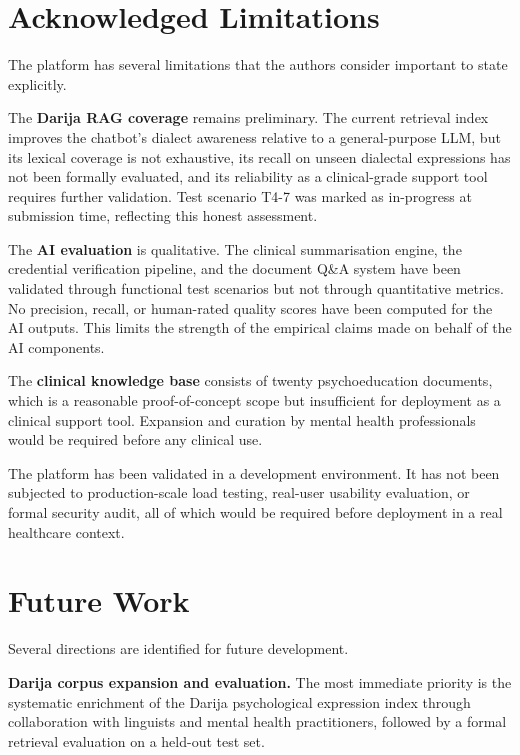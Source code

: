 \documentclass[a4paper,12pt]{report}
\begin{document}
\section*{Acknowledged Limitations}
{}

The platform has several limitations that the authors consider important
to state explicitly.

The \textbf{Darija RAG coverage} remains preliminary. The current retrieval
index improves the chatbot's dialect awareness relative to a general-purpose
LLM, but its lexical coverage is not exhaustive, its recall on unseen
dialectal expressions has not been formally evaluated, and its reliability
as a clinical-grade support tool requires further validation. Test scenario
T4-7 was marked as in-progress at submission time, reflecting this honest
assessment.

The \textbf{AI evaluation} is qualitative. The clinical summarisation engine,
the credential verification pipeline, and the document Q\&A system have been
validated through functional test scenarios but not through quantitative
metrics. No precision, recall, or human-rated quality scores have been
computed for the AI outputs. This limits the strength of the empirical claims
made on behalf of the AI components.

The \textbf{clinical knowledge base} consists of twenty psychoeducation
documents, which is a reasonable proof-of-concept scope but insufficient
for deployment as a clinical support tool. Expansion and curation by mental
health professionals would be required before any clinical use.

The platform has been validated in a development environment. It has not been
subjected to production-scale load testing, real-user usability evaluation,
or formal security audit, all of which would be required before deployment in
a real healthcare context.

\section*{Future Work}
{}

Several directions are identified for future development.

\textbf{Darija corpus expansion and evaluation.} The most immediate priority
is the systematic enrichment of the Darija psychological expression index
through collaboration with linguists and mental health practitioners, followed
by a formal retrieval evaluation on a held-out test set.
\end{document}
